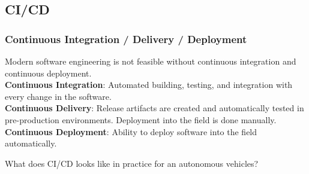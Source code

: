 
\subsection{CI/CD}

\begin{frame}
\frametitle{Continuous Integration / Delivery / Deployment}
Modern software engineering is not feasible without continuous integration and
continuous deployment.\\

\textbf{Continuous Integration}: Automated building, testing, and integration 
with every change in the software.\\

\textbf{Continuous Delivery}: Release artifacts are created and automatically
tested in pre-production environments. Deployment into the field is done
manually.\\

\textbf{Continuous Deployment}: Ability to deploy software into the field
automatically.\\

\pause

\begin{block}{}
What does CI/CD looks like in practice for an autonomous vehicles?
\end{block}
\end{frame}

